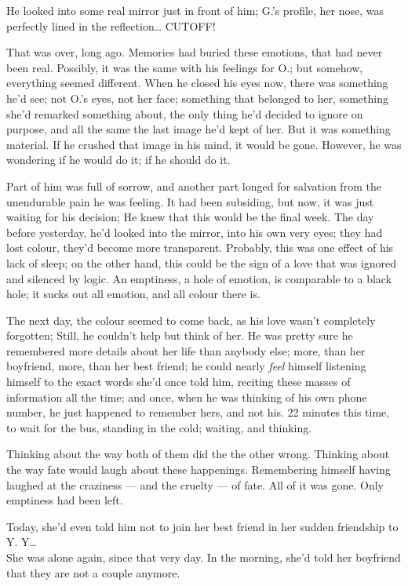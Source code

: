 He looked into some real mirror just in front of him; G.'s profile, her nose, was perfectly lined in the reflection\ldots
CUTOFF!

That was over, long ago. 
Memories had buried these emotions, that had never been real. 
Possibly, it was the same with his feelings for O.; but somehow, everything seemed different. 
When he closed his eyes now, there was something he'd see; not O.'s eyes, not her face; something that belonged to her, something she'd remarked something about, the only thing he'd decided to ignore on purpose, and all the same the last image he'd kept of her. 
But it was something material. 
If he crushed that image in his mind, it would be gone. 
However, he was wondering if he would do it; if he should do it.

Part of him was full of sorrow, and another part longed for salvation from the unendurable pain he was feeling. 
It had been subsiding, but now, it was just waiting for his decision; He knew that this would be the final week. 
The day before yesterday, he'd looked into the mirror, into his own very eyes; they had lost colour, they'd become more transparent. 
Probably, this was one effect of his lack of sleep; on the other hand, this could be the sign of a love that was ignored and silenced by logic. 
An emptiness, a hole of emotion, is comparable to a black hole; it sucks out all emotion, and all colour there is.

The next day, the colour seemed to come back, as his love wasn't completely forgotten; Still, he couldn't help but think of her. 
He was pretty sure he remembered more details about her life than anybody else; more, than her boyfriend, more, than her best friend; he could nearly \emph{feel} himself listening himself to the exact words she'd once told him, reciting these masses of information all the time; and once, when he was thinking of his own phone number, he just happened to remember hers, and not his. 
22 minutes this time, to wait for the bus, standing in the cold; waiting, and thinking.

Thinking about the way both of them did the the other wrong. 
Thinking about the way fate would laugh about these happenings. 
Remembering himself having laughed at the craziness --- and the cruelty --- of fate. 
All of it was gone. 
Only emptiness had been left.

Today, she'd even told him not to join her best friend in her sudden friendship to Y. 
Y\ldots\\
She was alone again, since that very day. 
In the morning, she'd told her boyfriend that they are not a couple anymore.

